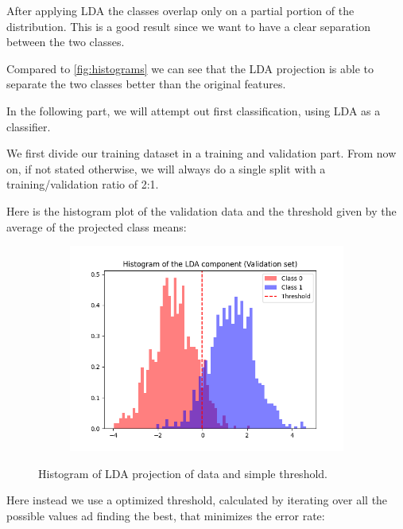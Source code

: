 \documentclass[12pt]{report}
\newcommand{\nnl}{%
    \newline
    \newline
}
\newcommand{\nl}{%
    \newline
    \noindent
}
\begin{document}
\noindent
After applying LDA the classes overlap only on a partial portion of the distribution. This is a good result since we want to have a clear separation between the two classes.
\nl
Compared to \autoref{fig:histograms} we can see that the LDA projection is able to separate the two classes better than the original features.
\nnl
In the following part, we will attempt out first classification, using LDA as a classifier.
\nl
We first divide our training dataset in a training and validation part. From now on, if not stated otherwise, we will always do a single split with a training/validation ratio of 2:1.
\nnl
Here is the histogram plot of the validation data and the threshold given by the average of the projected class means:
\begin{figure}[H]
    \centering
    \begin{subfigure}[t]{0.7\textwidth}
        \includegraphics[width=\textwidth]{./plot/dim_red/LDA_threshold_base.png}
    \end{subfigure}
    \caption{Histogram of LDA projection of data and simple threshold.}
    \label{fig:LDA_threshold_base}
\end{figure}
\noindent
Here instead we use a optimized threshold, calculated by iterating over all the possible values ad finding the best, that minimizes the error rate:
\end{document}
